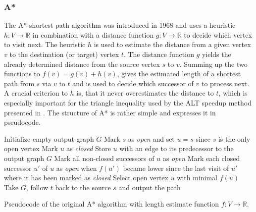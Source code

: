 		\subsubsection{A*}
		\label{subsubsec:astar}
		
			The A* shortest path algorithm was introduced in 1968 and uses a heuristic $h : V \rightarrow \mathbb{R}$ in combination with a distance function $g : V \rightarrow \mathbb{R}$ to decide which vertex to visit next\cite{astar}.
			The heuristic $h$ is used to estimate the distance from a given vertex $v$ to the destination (or target) vertex $t$.
			The distance function $g$ yields the already determined distance from the source vertex $s$ to $v$.
			Summing up the two functions to $f(v) = g(v) + h(v)$, gives the estimated length of a shortest path from $s$ via $v$ to $t$ and is used to decide which successor of $v$ to process next.
			A crucial criterion to $h$ is, that it never overestimates the distance to $t$, which is especially important for the triangle inequality used by the ALT speedup method presented in .
			The structure of A* is rather simple and  expresses it in pseudocode.
			
			\begin{algorithm}[h]
				\begin{algorithmic}[1]
					\State Initialize empty output graph $G$
					\State Mark $s$ as \emph{open} and set $u = s$ since $s$ is the only open vertex
						\State Mark $u$ as \emph{closed}
						\State Store $u$ with an edge to its predecessor to the output graph $G$
						\State Mark all non-closed successors of $u$ as \emph{open} \label{alg:astar-open-1}
						\State Mark each closed successor $u'$ of $u$ as \emph{open} when $f(u')$ became lower since the last visit of $u'$ where it has been marked as \emph{closed} \label{alg:astar-open-2}
						\State Select open vertex $u$ with minimal $f(u)$
					\EndWhile
					\State Take $G$, follow $t$ back to the source $s$ and output the path
				\end{algorithmic}
				\caption{Pseudocode of the original A* algorithm\cite{astar} with length estimate function $f:V\rightarrow\mathbb{R}$.}
				\label{alg:astar}
			\end{algorithm}
			

